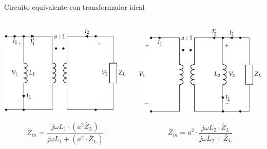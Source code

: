 \documentclass[xcolor={usenames,svgnames,dvipsnames}]{beamer}
\begin{document}
\begin{frame}[label={sec:org54cf8a2}]{Circuito equivalente con transformador ideal}
\begin{columns}
\begin{column}{0.5\columnwidth}
\begin{center}
\includegraphics[width=.9\linewidth]{../figs/TrafoPerfecto_Ideal.pdf}
\end{center}

\[
  \boxed{\overline{Z}_{in} = \frac{j \omega L_1 \cdot (a^2 \overline{Z}_L)}{j\omega L_1 + (a^2 \cdot \overline{Z}_L)}}
\]
\end{column}
\begin{column}{0.5\columnwidth}
\begin{center}
\includegraphics[width=.9\linewidth]{../figs/TrafoPerfecto_Ideal2.pdf}
\end{center}

\[
  \boxed{\overline{Z}_{in} = a^2 \cdot \frac{j \omega L_2 \cdot \overline{Z}_L}{j\omega L_2 + \overline{Z}_L}}
\]
\end{column}
\end{columns}
\end{frame}
\end{document}
